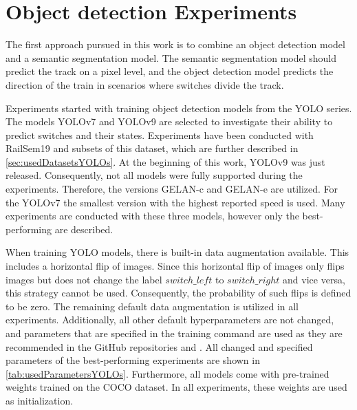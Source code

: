 \section{Object detection Experiments}
\label{sec:objectDetectionExperiments}

The first approach pursued in this work is to combine an object detection model and a semantic segmentation model.
The semantic segmentation model should predict the track on a pixel level, and the object detection model predicts the direction of the train in scenarios where switches divide the track.

Experiments started with training object detection models from the \ac{YOLO} series.
The models \ac{YOLO}v7 \cite{yolov7} and \ac{YOLO}v9 \cite{YOLOv9} are selected to investigate their ability to predict switches and their states.
Experiments have been conducted with RailSem19 and subsets of this dataset, which are further described in \autoref{sec:usedDatasetsYOLOs}.
At the beginning of this work, \ac{YOLO}v9 was just released.
Consequently, not all models were fully supported during the experiments.
Therefore, the versions \ac{GELAN}-c and \ac{GELAN}-e are utilized.
For the \ac{YOLO}v7 the smallest version with the highest reported speed is used.
Many experiments are conducted with these three models, however only the best-performing are described.

When training \ac{YOLO} models, there is built-in data augmentation available.
This includes a horizontal flip of images.
Since this horizontal flip of images only flips images but does not change the label $switch\_left$ to $switch\_right$ and vice versa, this strategy cannot be used.
Consequently, the probability of such flips is defined to be zero. The remaining default data augmentation is utilized in all experiments.
Additionally, all other default hyperparameters are not changed, and parameters that are specified in the training command are used as they are recommended in the GitHub repositories \cite{YOLOv7GitHub} and \cite{YOLOv9GitHub}.
All changed and specified parameters of the best-performing experiments are shown in \autoref{tab:usedParametersYOLOs}.
Furthermore, all models come with pre-trained weights trained on the COCO dataset.
In all experiments, these weights are used as initialization.

